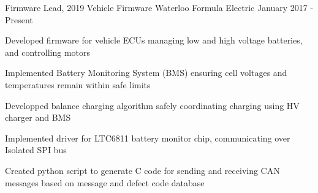 

\begin{cventries}
  \cventrytwo
    {Firmware Lead, 2019 Vehicle Firmware} %
    {Waterloo Formula Electric} %
    {} %
    {January 2017 - Present} %
    {
      \begin{cvitems}
        \item {Developed firmware for vehicle ECUs managing low and high voltage batteries, and controlling motors}
        \item {Implemented Battery Monitoring System (BMS) ensuring cell voltages and temperatures remain within safe limits}
        \item {Developped balance charging algorithm safely coordinating charging using HV charger and BMS}
        \item {Implemented driver for LTC6811 battery monitor chip, communicating over Isolated SPI bus}
        \item {Created python script to generate C code for sending and receiving CAN messages based on message and defect code database}
      \end{cvitems}
    }


\end{cventries}
